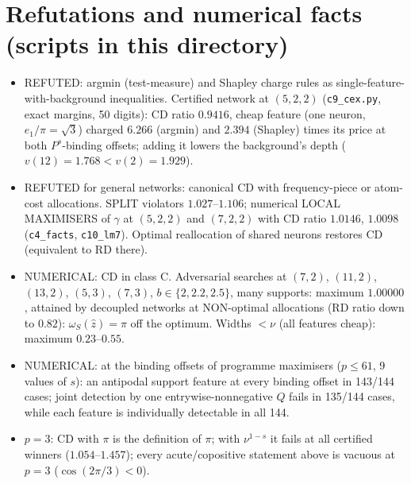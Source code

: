 \documentclass[11pt]{article}
\theoremstyle{definition}
\begin{document}
\section{Refutations and numerical facts (scripts in this directory)}\label{sec:ref}
\begin{itemize}
\item REFUTED: argmin (test-measure) and Shapley charge rules as single-feature-with-background inequalities. Certified network at
$(5,2,2)$ (\texttt{c9\_cex.py}, exact margins, 50 digits): CD ratio $0.9416$, cheap feature (one neuron, $e_1/\pi=\sqrt3$) charged
$6.266$ (argmin) and $2.394$ (Shapley) times its price at both $P^s$-binding offsets; adding it lowers the background's depth
($v(12)=1.768<v(2)=1.929$).
\item REFUTED for general networks: canonical CD with frequency-piece or atom-cost allocations. SPLIT violators $1.027$--$1.106$;
numerical LOCAL MAXIMISERS of $\gamma$ at $(5,2,2)$ and $(7,2,2)$ with CD ratio $1.0146$, $1.0098$ (\texttt{c4\_facts}, \texttt{c10\_lm7}).
Optimal reallocation of shared neurons restores CD (equivalent to RD there).
\item NUMERICAL: CD in class C. Adversarial searches at $(7,2)$, $(11,2)$, $(13,2)$, $(5,3)$, $(7,3)$, $b\in\{2,2.2,2.5\}$, many supports:
maximum $1.00000$, attained by decoupled networks at NON-optimal allocations (RD ratio down to $0.82$): $\omega_S(\hat z)=\pi$ off the
optimum. Widths $<\nu$ (all features cheap): maximum $0.23$--$0.55$.
\item NUMERICAL: at the binding offsets of programme maximisers ($p\le61$, 9 values of $s$): an antipodal support feature at every
binding offset in 143/144 cases; joint detection by one entrywise-nonnegative $Q$ fails in 135/144 cases, while each feature is
individually detectable in all 144.
\item $p=3$: CD with $\pi$ is the definition of $\pi$; with $\nu^{1-s}$ it fails at all certified winners ($1.054$--$1.457$); every
acute/copositive statement above is vacuous at $p=3$ ($\cos(2\pi/3)<0$).
\end{itemize}
\end{document}
